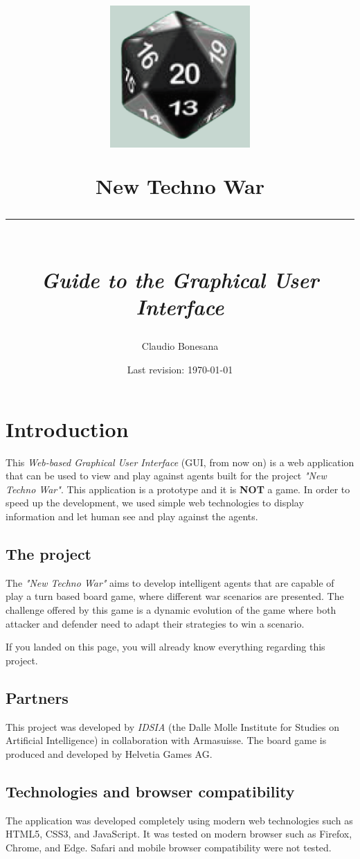 \documentclass[a4paper]{article}
\author{Claudio Bonesana}
\title{
	\begin{center}
		\includegraphics[width=0.4\textwidth]{dice.png}
    \end{center}
    \Large New Techno War \\
	\rule{10cm}{0.3mm} \\
	\large \textit{Guide to the Graphical User Interface} \\
}
\date{Last revision: \today}
\begin{document}
	
	\maketitle
	


	\section{Introduction}

	This \textit{Web-based Graphical User Interface} (GUI, from now on) is a web application that can be used to view and play against agents built for the project \textit{"New Techno War"}. This application is a prototype and it is \textbf{NOT} a game. In order to speed up the development, we used simple web technologies to display information and let human see and play against the agents.

	\subsection{The project}

	The \textit{"New Techno War"} aims to develop intelligent agents that are capable of play a turn based board game, where different war scenarios are presented. The challenge offered by this game is a dynamic evolution of the game where both attacker and defender need to adapt their strategies to win a scenario.

	If you landed on this page, you will already know everything regarding this project.

	\subsection{Partners}

	This project was developed by \textit{IDSIA} (the Dalle Molle Institute for Studies on Artificial Intelligence) in collaboration with Armasuisse. The board game is produced and developed by Helvetia Games AG.

	\subsection{Technologies and browser compatibility}

	The application was developed completely using modern web technologies such as HTML5, CSS3, and JavaScript. It was tested on modern browser such as Firefox, Chrome, and Edge. Safari and mobile browser compatibility were not tested.
\end{document}
